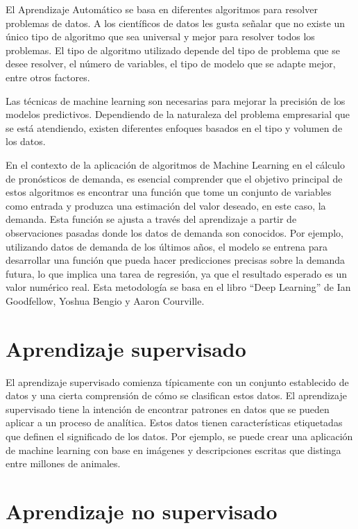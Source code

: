 \vspace{1\baselineskip}El Aprendizaje Automático se basa en diferentes algoritmos para resolver problemas de datos. A los científicos de datos les gusta señalar que no existe un único tipo de algoritmo que sea universal y mejor para resolver todos los problemas. El tipo de algoritmo utilizado depende del tipo de problema que se desee resolver, el número de variables, el tipo de modelo que se adapte mejor, entre otros factores. 

Las técnicas de machine learning son necesarias para mejorar la precisión de los modelos predictivos. Dependiendo de la naturaleza del problema empresarial que se está atendiendo, existen diferentes enfoques basados en el tipo y volumen de los datos\cite{ibm}.

En el contexto de la aplicación de algoritmos de Machine Learning en el cálculo de pronósticos de demanda, es esencial comprender que el objetivo principal de estos algoritmos es encontrar una función que tome un conjunto de variables como entrada y produzca una estimación del valor deseado, en este caso, la demanda. Esta función se ajusta a través del aprendizaje a partir de observaciones pasadas donde los datos de demanda son conocidos. Por ejemplo, utilizando datos de demanda de los últimos años, el modelo se entrena para desarrollar una función que pueda hacer predicciones precisas sobre la demanda futura, lo que implica una tarea de regresión, ya que el resultado esperado es un valor numérico real. Esta metodología se basa en el libro “Deep Learning” de Ian Goodfellow, Yoshua Bengio y Aaron Courville\cite{goodfellow2016deep}.

\section{Aprendizaje supervisado}

El aprendizaje supervisado comienza típicamente con un conjunto establecido de datos y una cierta comprensión de cómo se clasifican estos datos. El aprendizaje supervisado tiene la intención de encontrar patrones en datos que se pueden aplicar a un proceso de analítica. Estos datos tienen características etiquetadas que definen el significado de los datos. Por ejemplo, se puede crear una aplicación de machine learning con base en imágenes y descripciones escritas que distinga entre millones de animales\cite{ibm}.

\section{Aprendizaje no supervisado}

